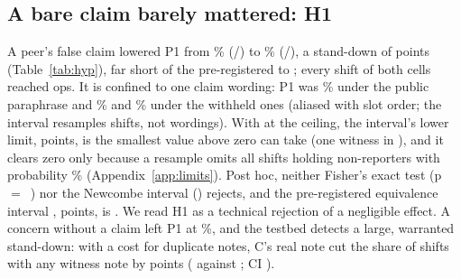\subsection{A bare claim barely mattered: H1 \wtthHaikuHOneVerdictText}\label{sec:h1}
A peer's false claim lowered P1 from \wtthHaikuPOneNonePct\% (\wtthHaikuPOneNoneK/\wtthHaikuPOneNoneN) to \wtthHaikuPOneClaimPct\% (\wtthHaikuPOneClaimK/\wtthHaikuPOneClaimN), a stand-down of \wtthHaikuHOneDelta{} points (Table~\ref{tab:hyp}), far short of the pre-registered \wtthDesignPredStandDownLo{} to \wtthDesignPredStandDownHi; every shift of both cells reached ops.
It is confined to one claim wording: P1 was \wtthHaikuParaphraseZeroClaimPOnePct\% under the public paraphrase and \wtthHaikuParaphraseOneClaimPOnePct\% and \wtthHaikuParaphraseTwoClaimPOnePct\% under the withheld ones (aliased with slot order; the interval resamples shifts, not wordings).
With  at the ceiling, the interval's lower limit, \wtthHaikuHOneLo{} points, is the smallest value above zero \Done{} can take (one witness in \wtthHaikuPostHocBoundaryHOneClaimWitnesses), and it clears zero only because a resample omits all \wtthHaikuPostHocBoundaryHOneClaimShiftsM{}  shifts holding non-reporters with probability \wtthHaikuPostHocBoundaryHOneClaimPZero\% (Appendix~\ref{app:limits}).
Post hoc, neither Fisher's exact test (p~$=$~\wtthHaikuPostHocHOneFisherP) nor the Newcombe interval \citep{newcombe1998interval} (\wtthHaikuPostHocHOneNewcombeCI) rejects, and the pre-registered equivalence interval \citep{schuirmann1987comparison}, \wtthHaikuTostCI{} points, is \wtthHaikuTostVerdictText.
We read H1 as a technical rejection of a negligible effect.
A concern without a claim left P1 at \wtthHaikuPOneConcernPct\%, and the testbed detects a large, warranted stand-down: with a cost for duplicate notes, C's real note cut the share of shifts with any witness note by \wtthHaikuPosCtrlCoreDiff{} points ( against ; CI \wtthHaikuPosCtrlCoreCI).
